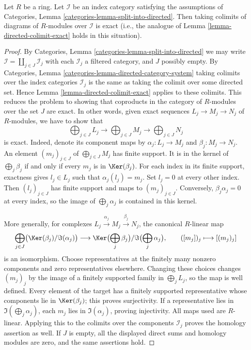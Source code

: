 \begin{lemma}
\label{lemma-almost-directed-colimit-exact}
Let $R$ be a ring. Let $\mathcal{I}$ be an index category satisfying the assumptions of
Categories, Lemma \ref{categories-lemma-split-into-directed}.
Then taking colimits of diagrams of $R$-modules over $\mathcal{I}$
is exact (i.e., the analogue of
Lemma \ref{lemma-directed-colimit-exact}
holds in this situation).
\end{lemma}

\begin{proof}
By
Categories, Lemma \ref{categories-lemma-split-into-directed}
we may write $\mathcal{I} = \coprod_{j \in J} \mathcal{I}_j$ with each
$\mathcal{I}_j$ a filtered category, and $J$ possibly empty. By
Categories, Lemma \ref{categories-lemma-directed-category-system}
taking colimits over the index categories $\mathcal{I}_j$ is
the same as taking the colimit over some directed set. Hence
Lemma \ref{lemma-directed-colimit-exact}
applies to these colimits. This reduces the problem to showing that
coproducts in the category of $R$-modules over the set $J$ are exact.
In other words, given exact sequences
$L_j \to M_j \to N_j$ of $R$-modules, we have to show that
$$
\bigoplus\nolimits_{j \in J} L_j
\longrightarrow
\bigoplus\nolimits_{j \in J} M_j
\longrightarrow
\bigoplus\nolimits_{j \in J} N_j
$$
is exact. Indeed, denote its component maps by
$\alpha_j : L_j \to M_j$ and $\beta_j : M_j \to N_j$.
An element $(m_j)_{j \in J}$ of $\bigoplus_{j \in J} M_j$
has finite support. It is in the kernel of $\bigoplus_j\beta_j$
if and only if every $m_j$ is in $\Ker(\beta_j)$.
For each index in its finite support, exactness gives
$l_j \in L_j$ such that $\alpha_j(l_j) = m_j$.
Set $l_j = 0$ at every other index. Then $(l_j)_{j \in J}$
has finite support and maps to $(m_j)_{j \in J}$.
Conversely, $\beta_j\alpha_j = 0$ at every index, so the image
of $\bigoplus_j\alpha_j$ is contained in this kernel.

\medskip\noindent
More generally, for complexes $L_j \xrightarrow{\alpha_j} M_j
\xrightarrow{\beta_j} N_j$, the canonical $R$-linear map
$$
\bigoplus_{j \in J}
\bigl(\Ker(\beta_j)/\Im(\alpha_j)\bigr)
\longrightarrow
\Ker\bigl(\bigoplus_j\beta_j\bigr)
/\Im\bigl(\bigoplus_j\alpha_j\bigr),
\qquad ([m_j])_j \longmapsto [(m_j)_j]
$$
is an isomorphism. Choose representatives at the finitely many
nonzero components and zero representatives elsewhere. Changing these
choices changes $(m_j)_j$ by the image of a finitely supported
family in $\bigoplus_j L_j$, so the map is well defined.
Every element of the target has a finitely supported representative
whose components lie in $\Ker(\beta_j)$; this proves surjectivity.
If a representative lies in $\Im(\bigoplus_j\alpha_j)$, each
$m_j$ lies in $\Im(\alpha_j)$, proving injectivity.
All maps used are $R$-linear. Applying this to the colimits over
the components $\mathcal{I}_j$ proves the homology assertion as well.
If $J$ is empty, all the displayed direct sums and homology modules
are zero, and the same assertions hold.
\end{proof}